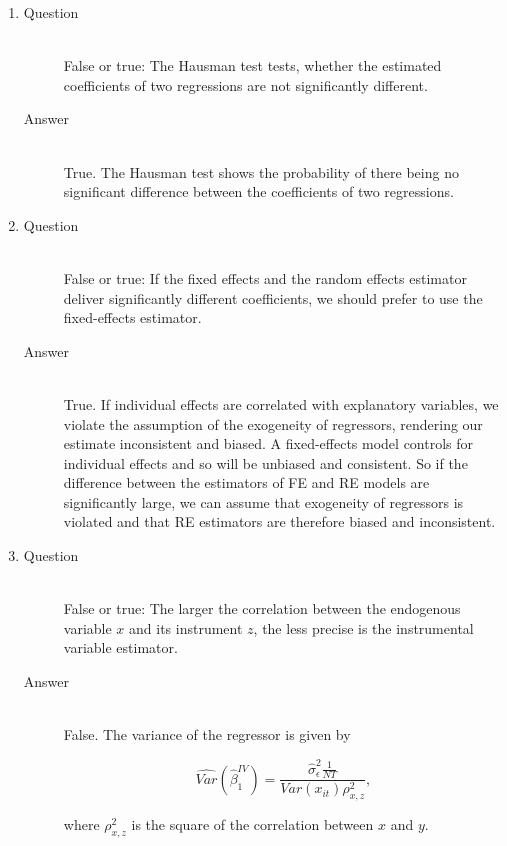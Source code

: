 \documentclass{article}
\begin{document}
\begin{enumerate}
  \item
  \begin{description}
    \item[Question] \hfill \\
    False or true: The Hausman test tests, whether the estimated coefficients of two regressions are not significantly different.
    \item[Answer] \hfill \\
    True. The Hausman test shows the probability of there being no significant difference between the coefficients of two regressions.
  \end{description}
  
  \item
  \begin{description}
    \item[Question] \hfill \\
    False or true: If the fixed effects and the random effects estimator deliver significantly different coefficients, we should prefer to use the fixed-effects estimator.
    \item[Answer] \hfill \\
    True. If individual effects are correlated with explanatory variables, we violate the assumption of the exogeneity of regressors, rendering our estimate inconsistent and biased. A fixed-effects model controls for individual effects and so will be unbiased and consistent. So if the difference between the estimators of FE and RE models are significantly large, we can assume that exogeneity of regressors is violated and that RE estimators are therefore biased and inconsistent.
    
  \end{description}
  
  \item
  \begin{description}
    \item[Question] \hfill \\
    False or true: The larger the correlation between the endogenous variable \(x\) and its instrument \(z\), the less precise is the instrumental variable estimator.
    \item[Answer] \hfill \\
    False. The variance of the regressor is given by
    
    \[ \hat{Var}(\hat{\beta}^{IV}_{1}) = \frac{\hat{\sigma}^2_{\epsilon}\frac{1}{NT}}{Var(x_{it})\rho^2_{x,z}},  \]
    
    where \(\rho^2_{x,z}\) is the square of the correlation between \( x \) and \( y \).
    

\end{description}
\end{enumerate}
\end{document}

